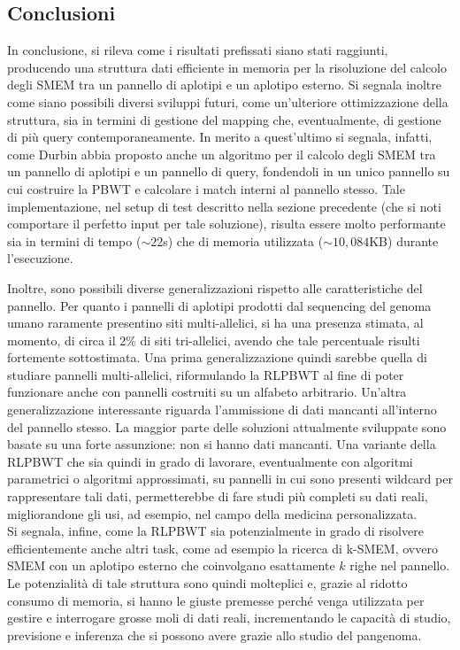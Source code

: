 \documentclass[a4paper,11pt, oneside,italian]{article}
\begin{document}
\subsection*{Conclusioni}
In conclusione, si rileva come i risultati prefissati siano stati raggiunti,
producendo una struttura dati efficiente in memoria per la risoluzione del
calcolo degli SMEM tra un pannello di aplotipi e un aplotipo
esterno.  
Si segnala inoltre come siano possibili diversi sviluppi futuri, come
un'ulteriore ottimizzazione della struttura, sia in termini 
di gestione del mapping che, eventualmente, di gestione di più query
contemporaneamente. In merito a quest'ultimo si segnala, infatti, come Durbin
abbia proposto anche un algoritmo per il calcolo degli SMEM tra un pannello di
aplotipi e un pannello di query, fondendoli in un unico pannello su cui
costruire la PBWT e calcolare i match interni al pannello stesso. Tale
implementazione, nel setup di test 
descritto nella sezione precedente (che si noti comportare il perfetto input per
tale soluzione), risulta essere molto performante sia in
termini di tempo ($\sim 22$s) che di memoria utilizzata ($\sim
10,084$KB) durante l'esecuzione. 

Inoltre, sono possibili diverse generalizzazioni rispetto alle caratteristiche
del pannello. Per quanto i pannelli di aplotipi prodotti dal sequencing del
genoma umano raramente presentino siti multi-allelici, si ha una 
presenza stimata, al momento, di circa il 2\% di siti tri-allelici, avendo che
tale percentuale risulti fortemente sottostimata. Una prima generalizzazione
quindi sarebbe quella di studiare pannelli multi-allelici, riformulando la
RLPBWT al fine di poter funzionare anche con pannelli costruiti su un
alfabeto arbitrario. Un'altra generalizzazione interessante riguarda
l'ammissione di 
dati mancanti all'interno del pannello stesso. La maggior parte delle soluzioni
attualmente sviluppate sono basate su una forte assunzione: non si hanno dati
mancanti. Una variante della RLPBWT che sia quindi in grado di
lavorare, eventualmente con algoritmi parametrici o algoritmi
  approssimati, 
su pannelli in cui sono presenti wildcard per rappresentare tali dati,
permetterebbe di fare studi più completi su dati reali, migliorandone gli usi,
ad esempio, nel campo della medicina personalizzata.\\ 
Si segnala, infine, come la RLPBWT sia potenzialmente in grado di
risolvere 
efficientemente anche altri task, come ad esempio la ricerca di k-SMEM,
ovvero SMEM con un aplotipo esterno che coinvolgano
esattamente $k$ righe nel pannello. \\
Le potenzialità di tale struttura sono quindi molteplici e, grazie al ridotto
consumo di memoria, si hanno le giuste premesse perché venga utilizzata per
gestire e interrogare grosse moli di dati reali, incrementando le capacità di
studio, previsione e inferenza che si possono avere grazie allo studio del
pangenoma.
\end{document}
